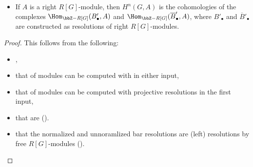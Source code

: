 \begin{corollary}
\begin{enumerate}
\begin{itemize}
        \item If $A$ is a right $R[G]$-module, then $H^n(G, A)$ is the cohomologies of the complexes $\Hom_{\bbZ-R[G]}(B'_\bullet, A)$ and $\Hom_{\bbZ-R[G]}(\overline{B}'_\bullet, A)$, where $B'_\bullet$ and $\overline{B}'_\bullet$ are constructed as resolutions of right $R[G]$-modules.
    \end{itemize}
\end{enumerate}

\end{corollary}
\begin{proof}
    This follows from the following:
    \begin{itemize}
        \item {}, 
        \item that  of modules can be computed with  in either input, 
        \item that  of modules can be computed with projective resolutions in the first input, 
        \item that  are  ().
        \item that the normalized and unnoramlized bar resolutions are (left) resolutions by free $R[G]$-modules ().
    \end{itemize}
\end{proof}